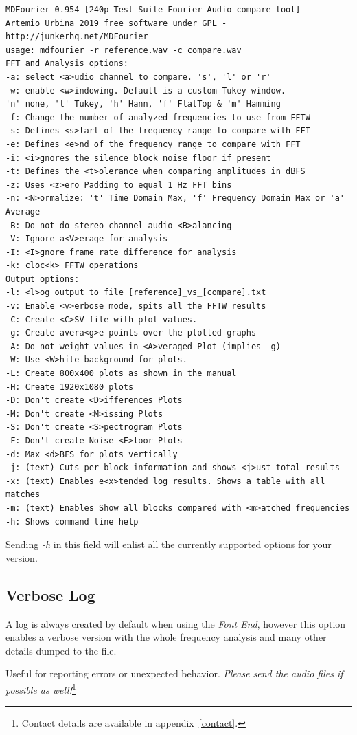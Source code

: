 \documentclass[10pt,a4paper]{report}
\begin{document}
\begin{appendices}
\begin{verbatim}
MDFourier 0.954 [240p Test Suite Fourier Audio compare tool]
Artemio Urbina 2019 free software under GPL - http://junkerhq.net/MDFourier
usage: mdfourier -r reference.wav -c compare.wav
FFT and Analysis options:
-a: select <a>udio channel to compare. 's', 'l' or 'r'
-w: enable <w>indowing. Default is a custom Tukey window.
'n' none, 't' Tukey, 'h' Hann, 'f' FlatTop & 'm' Hamming
-f: Change the number of analyzed frequencies to use from FFTW
-s: Defines <s>tart of the frequency range to compare with FFT
-e: Defines <e>nd of the frequency range to compare with FFT
-i: <i>gnores the silence block noise floor if present
-t: Defines the <t>olerance when comparing amplitudes in dBFS
-z: Uses <z>ero Padding to equal 1 Hz FFT bins
-n: <N>ormalize: 't' Time Domain Max, 'f' Frequency Domain Max or 'a' Average
-B: Do not do stereo channel audio <B>alancing
-V: Ignore a<V>erage for analysis
-I: <I>gnore frame rate difference for analysis
-k: cloc<k> FFTW operations
Output options:
-l: <l>og output to file [reference]_vs_[compare].txt
-v: Enable <v>erbose mode, spits all the FFTW results
-C: Create <C>SV file with plot values.
-g: Create avera<g>e points over the plotted graphs
-A: Do not weight values in <A>veraged Plot (implies -g)
-W: Use <W>hite background for plots.
-L: Create 800x400 plots as shown in the manual
-H: Create 1920x1080 plots
-D: Don't create <D>ifferences Plots
-M: Don't create <M>issing Plots
-S: Don't create <S>pectrogram Plots
-F: Don't create Noise <F>loor Plots
-d: Max <d>BFS for plots vertically
-j: (text) Cuts per block information and shows <j>ust total results
-x: (text) Enables e<x>tended log results. Shows a table with all matches
-m: (text) Enables Show all blocks compared with <m>atched frequencies
-h: Shows command line help
\end{verbatim}

Sending \textit{-h} in this field will enlist all the currently supported options for your version.

\subsection{Verbose Log}
\label{verbose}

A log is always created by default when using the \textit{Font End}, however this option enables a verbose version with the whole frequency analysis and many other details dumped to the file. 

Useful for reporting errors or unexpected behavior. \textit{Please send the audio files if possible as well!}\footnote{Contact details are available in appendix~\ref{contact}.}
	

\end{appendices}
\end{document}
